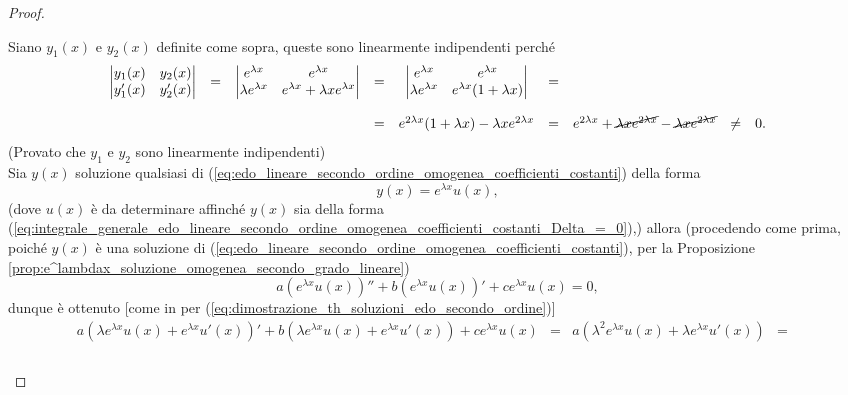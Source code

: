 \begin{proof}
\begin{enumerate}
		\noindent Siano $y_1(x)$ e $y_2(x)$ definite come sopra, queste sono linearmente indipendenti perché
		\begin{equation*}
			\begin{matrix}
				\begin{vmatrix}
					y_1(x) & y_2(x)\\
					y_1'(x) & y_2'(x)
				\end{vmatrix} &=& 
				\begin{vmatrix}
					e^{\lambda x} & e^{\lambda x}\\
					\lambda e^{\lambda x} & e^{\lambda  x} + \lambda x e^{\lambda x}
				\end{vmatrix} &=& 
				\begin{vmatrix}
					e^{\lambda x} & e^{\lambda  x}\\
					\lambda  e^{\lambda x} &  e^{\lambda  x} (1 + \lambda x )
				\end{vmatrix} &=&\\\\
				&&&=& e^{2\lambda x}(1+\lambda x) - \lambda x e^{2\lambda x} &=& e^{2\lambda x} + \cancel{\lambda x e^{2\lambda x}} - \cancel{\lambda x e^{2\lambda x}} &\neq& 0.
			\end{matrix}
		\end{equation*}
		(Provato che $y_1$ e $y_2$ sono linearmente indipendenti)\\
		Sia $y(x)$ soluzione qualsiasi di (\ref{eq:edo_lineare_secondo_ordine_omogenea_coefficienti_costanti}) della forma 
		\begin{equation}\label{eq:integrale_generale_delta_=_0}
			y(x) = e^{\lambda x} u(x),
		\end{equation}
		(dove $u(x)$ è da determinare affinché $y(x)$ sia della forma (\ref{eq:integrale_generale_edo_lineare_secondo_ordine_omogenea_coefficienti_costanti_Delta_=_0}),) allora (procedendo come prima, poiché $y(x)$ è una soluzione di (\ref{eq:edo_lineare_secondo_ordine_omogenea_coefficienti_costanti}), per la Proposizione \ref{prop:e^lambdax_soluzione_omogenea_secondo_grado_lineare})
		\begin{equation*}
			a(e^{\lambda x}u(x))'' + b(e^{\lambda x} u(x))' + c e^{\lambda x} u(x) =0,
		\end{equation*}
		dunque è ottenuto [come in per (\ref{eq:dimostrazione_th_soluzioni_edo_secondo_ordine})]
		\begin{equation*}
			\begin{matrix}
				a(\lambda e^{\lambda x}u(x)+e^{\lambda x}u'(x))' + b(\lambda e^{\lambda x}u(x) + e^{\lambda x}u'(x)) + ce^{\lambda x}u(x) &=& a(\lambda^2e^{\lambda x} u(x) + \lambda e ^{\lambda x}u'(x)) &=&\\\\

\end{matrix}
\end{equation*}
\end{enumerate}
\end{proof}
